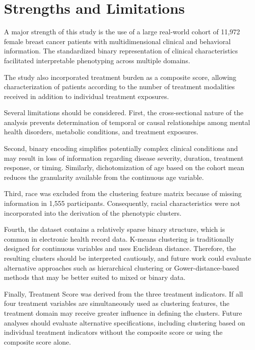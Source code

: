 \documentclass[11pt]{article}
\begin{document}
\section{Strengths and Limitations}

A major strength of this study is the use of a large real-world cohort of 11,972 female breast cancer patients with multidimensional clinical and behavioral information. The standardized binary representation of clinical characteristics facilitated interpretable phenotyping across multiple domains.

The study also incorporated treatment burden as a composite score, allowing characterization of patients according to the number of treatment modalities received in addition to individual treatment exposures.

Several limitations should be considered. First, the cross-sectional nature of the analysis prevents determination of temporal or causal relationships among mental health disorders, metabolic conditions, and treatment exposures.

Second, binary encoding simplifies potentially complex clinical conditions and may result in loss of information regarding disease severity, duration, treatment response, or timing. Similarly, dichotomization of age based on the cohort mean reduces the granularity available from the continuous age variable.

Third, race was excluded from the clustering feature matrix because of missing information in 1,555 participants. Consequently, racial characteristics were not incorporated into the derivation of the phenotypic clusters.

Fourth, the dataset contains a relatively sparse binary structure, which is common in electronic health record data. K-means clustering is traditionally designed for continuous variables and uses Euclidean distance. Therefore, the resulting clusters should be interpreted cautiously, and future work could evaluate alternative approaches such as hierarchical clustering or Gower-distance-based methods that may be better suited to mixed or binary data.

Finally, Treatment Score was derived from the three treatment indicators. If all four treatment variables are simultaneously used as clustering features, the treatment domain may receive greater influence in defining the clusters. Future analyses should evaluate alternative specifications, including clustering based on individual treatment indicators without the composite score or using the composite score alone.
\end{document}
